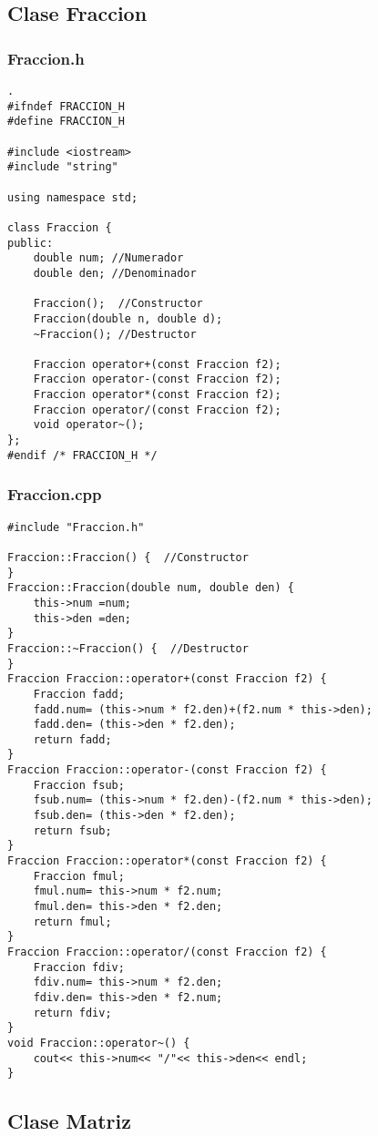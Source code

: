 \documentclass[11pt]{article}
\begin{document}
\subsection{Clase Fraccion}
\subsubsection*{Fraccion.h}
\begin{lstlisting}.
#ifndef FRACCION_H
#define FRACCION_H

#include <iostream>
#include "string"

using namespace std;

class Fraccion {
public:
	double num; //Numerador 	
	double den; //Denominador 	

	Fraccion();  //Constructor
	Fraccion(double n, double d);
	~Fraccion(); //Destructor

	Fraccion operator+(const Fraccion f2);
	Fraccion operator-(const Fraccion f2);
	Fraccion operator*(const Fraccion f2);
	Fraccion operator/(const Fraccion f2);
	void operator~();
};
#endif /* FRACCION_H */	
\end{lstlisting}
\vspace{2 em}
\subsubsection*{Fraccion.cpp}
\begin{lstlisting}
#include "Fraccion.h"

Fraccion::Fraccion() {  //Constructor	
}
Fraccion::Fraccion(double num, double den) {
	this->num =num;
	this->den =den;
}
Fraccion::~Fraccion() {  //Destructor
}	
Fraccion Fraccion::operator+(const Fraccion f2) {
	Fraccion fadd;
	fadd.num= (this->num * f2.den)+(f2.num * this->den);
	fadd.den= (this->den * f2.den);
	return fadd;
}
Fraccion Fraccion::operator-(const Fraccion f2) {	
	Fraccion fsub;
	fsub.num= (this->num * f2.den)-(f2.num * this->den);
	fsub.den= (this->den * f2.den);
	return fsub;
}
Fraccion Fraccion::operator*(const Fraccion f2) {	
	Fraccion fmul;
	fmul.num= this->num * f2.num;
	fmul.den= this->den * f2.den;
	return fmul;
}
Fraccion Fraccion::operator/(const Fraccion f2) {	
	Fraccion fdiv;
	fdiv.num= this->num * f2.den;
	fdiv.den= this->den * f2.num;
	return fdiv;
}
void Fraccion::operator~() {	
	cout<< this->num<< "/"<< this->den<< endl;
}
\end{lstlisting}
\vspace{2 em}
\subsection{Clase Matriz}
\end{document}

